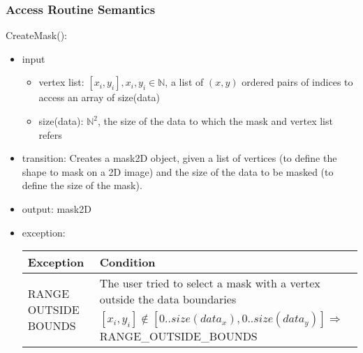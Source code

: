 \documentclass[12pt, titlepage]{article}
\begin{document}
\subsubsection{Access Routine Semantics}

\noindent CreateMask():
\begin{itemize}
    \item input
    \begin{itemize}
        \item vertex list: $[x_i, y_i], x_i, y_i \in \mathbb{N}$, a list of
        $(x,y)$ ordered pairs of indices to access an array of size(data)
        \item size(data): $\mathbb{N}^2$, the size of the data to which the mask
        and vertex list refers
    \end{itemize}
    \item transition: Creates a mask2D object, given a list of vertices (to
    define the shape to mask on a 2D image) and the size of the data to be
    masked (to define the size of the mask).
    \item output: mask2D
    \item exception:
    \begin{center}
        \begin{tabular}{p{3.5cm} p{12cm}}
            \toprule[0.15em]
            \textbf{Exception} & \textbf{Condition}\\
            \midrule[0.1em]
            \multirow{2}{0.25\textwidth}{RANGE OUTSIDE BOUNDS} & The user tried
            to select a mask with a vertex outside the data boundaries\\ 
            & $[x_i, y_i] \notin [0..size(data_x), 0..size(data_y)] \Rightarrow$
            RANGE\_OUTSIDE\_BOUNDS\\ 
            \bottomrule[0.15em]
        \end{tabular}
    \end{center}
\end{itemize}
\end{document}
